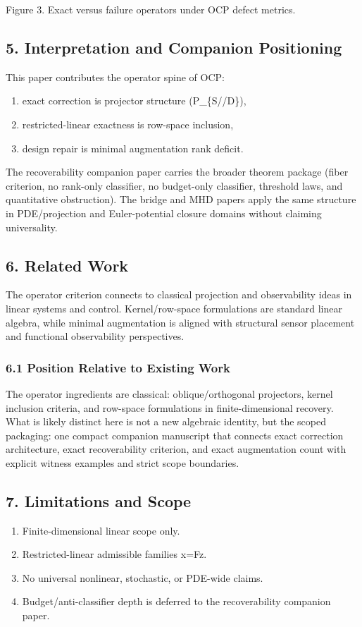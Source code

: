 \documentclass[11pt]{article}
\begin{document}
Figure 3. Exact versus failure operators under OCP defect metrics.


\subsection*{5. Interpretation and Companion Positioning}
This paper contributes the operator spine of OCP:

\begin{enumerate}
\item exact correction is projector structure (P\_\{S//D\}),
\item restricted-linear exactness is row-space inclusion,
\item design repair is minimal augmentation rank deficit.
\end{enumerate}

The recoverability companion paper carries the broader theorem package (fiber criterion, no rank-only classifier, no budget-only classifier, threshold laws, and quantitative obstruction). The bridge and MHD papers apply the same structure in PDE/projection and Euler-potential closure domains without claiming universality.


\subsection*{6. Related Work}
The operator criterion connects to classical projection and observability ideas in linear systems and control. Kernel/row-space formulations are standard linear algebra, while minimal augmentation is aligned with structural sensor placement and functional observability perspectives.


\subsubsection*{6.1 Position Relative to Existing Work}
The operator ingredients are classical: oblique/orthogonal projectors, kernel inclusion criteria, and row-space formulations in finite-dimensional recovery. What is likely distinct here is not a new algebraic identity, but the scoped packaging: one compact companion manuscript that connects exact correction architecture, exact recoverability criterion, and exact augmentation count with explicit witness examples and strict scope boundaries.


\subsection*{7. Limitations and Scope}
\begin{enumerate}
\item Finite-dimensional linear scope only.
\item Restricted-linear admissible families x=Fz.
\item No universal nonlinear, stochastic, or PDE-wide claims.
\item Budget/anti-classifier depth is deferred to the recoverability companion paper.
\end{enumerate}
\end{document}
